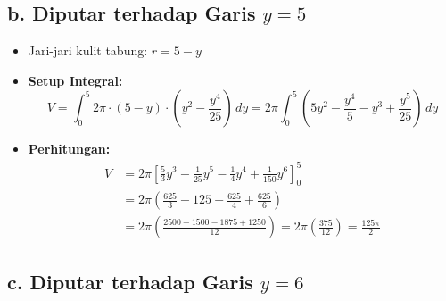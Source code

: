 \documentclass[12pt,a4paper]{article}
\begin{document}
\subsection*{b. Diputar terhadap Garis $y = 5$}
\begin{itemize}
  \item Jari-jari kulit tabung: $r = 5 - y$
  \item \textbf{Setup Integral:}
    \begin{equation*}
      V = \int_{0}^{5} 2\pi \cdot (5 - y) \cdot \left(y^2 - \frac{y^4}{25}\right) \, dy = 2\pi \int_{0}^{5} \left(5y^2 - \frac{y^4}{5} - y^3 + \frac{y^5}{25}\right) \, dy
    \end{equation*}
  \item \textbf{Perhitungan:}
    \begin{align*}
      V &= 2\pi \left[ \frac{5}{3}y^3 - \frac{1}{25}y^5 - \frac{1}{4}y^4 + \frac{1}{150}y^6 \right]_{0}^{5} \\
      &= 2\pi \left( \frac{625}{3} - 125 - \frac{625}{4} + \frac{625}{6} \right) \\
      &= 2\pi \left( \frac{2500 - 1500 - 1875 + 1250}{12} \right) = 2\pi \left( \frac{375}{12} \right) = \frac{125\pi}{2}
    \end{align*}
\end{itemize}

\subsection*{c. Diputar terhadap Garis $y = 6$}
\end{document}
